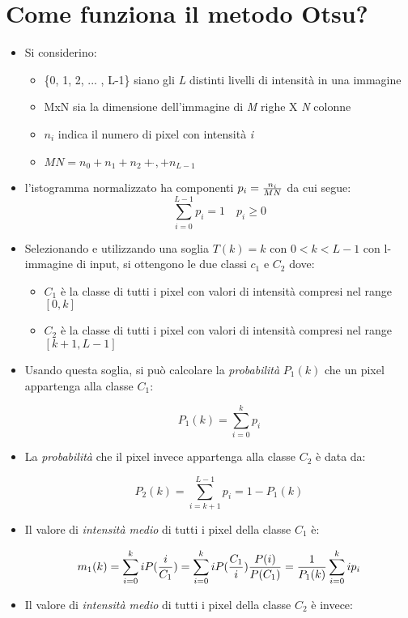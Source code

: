 \section{Come funziona il metodo Otsu?} 

\begin{itemize}
\item Si considerino: 

\begin{itemize}
\item \{0, 1, 2, ... , L-1\} siano gli \textit{L} distinti livelli di intensità in una immagine
\item MxN sia la dimensione dell'immagine di \textit{M} righe X \textit{N} colonne
\item $n_i$ indica il numero di pixel con intensità \textit{i}
\item $MN = n_0 + n_1 + n_2 + \dot{}, + n_{L-1}$
\end{itemize}

\item l'istogramma normalizzato ha componenti $p_i = {n_i \over MN}$ da cui segue:
$$\sum_{i=0}^{L-1} p_i = 1 \quad p_i \geq 0$$

\item Selezionando e utilizzando una soglia $T(k) = k$ con $0 < k < L-1$ con l-immagine di input, si ottengono le due classi $c_1$ e $C_2$ dove:

\begin{itemize}
\item $C_1$ è la classe di tutti i pixel con valori di intensità compresi nel range $[0, k]$
\item $C_2$ è la classe di tutti i pixel con valori di intensità compresi nel range $[k+1, L-1]$
\end{itemize}

\item Usando questa soglia, si può calcolare la \textit{probabilità} $P_1(k)$ che un pixel appartenga alla classe $C_1$:

$$
P_1(k) = \sum_{i=0}^{k} p_i
$$

\item La \textit{probabilità} che il pixel invece appartenga alla classe $C_2$ è data da:

$$
P_2(k) = \sum_{i=k+1}^{L-1} p_i = 1 - P_1(k)
$$

\item Il valore di \textit{intensità medio} di tutti i pixel della classe $C_1$ è:

$$
m_1(k) = \sum_{i=0}^{k} i P({i \over C_1}) = \sum_{i=0}^{k} i P({C_1 \over i}) {P(i) \over P(C_1)} = {1 \over P_1(k)} \sum_{i=0}^{k} i p_i
$$
\item Il valore di \textit{intensità medio} di tutti i pixel della classe $C_2$ è invece:


\end{itemize}
